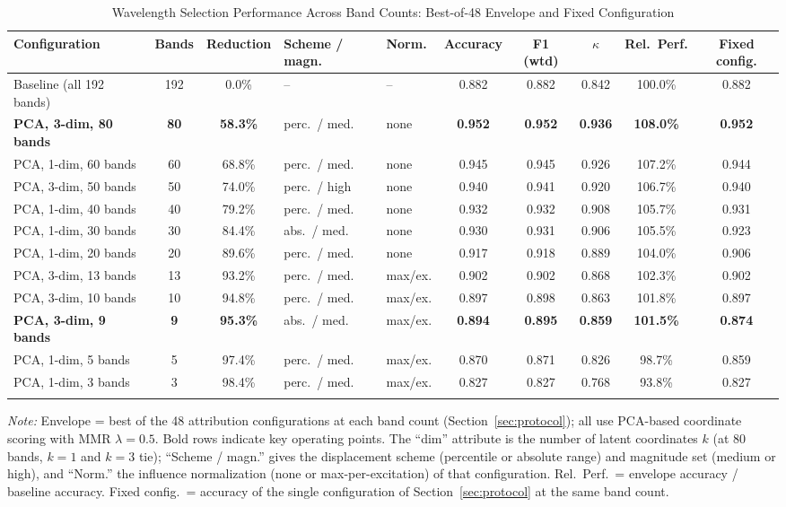 \begin{table}[!t]
\centering
\caption{Wavelength Selection Performance Across Band Counts: Best-of-48 Envelope and Fixed Configuration}
\label{tab:main_results}
\footnotesize
\begin{tabular}{@{}lccllccccc@{}}
\toprule
\textbf{Configuration} & \textbf{Bands} & \textbf{Reduction} & \textbf{Scheme / magn.} & \textbf{Norm.} & \textbf{Accuracy} & \textbf{F1 (wtd)} & \textbf{$\kappa$} & \textbf{Rel.\ Perf.} & \textbf{Fixed config.} \\
\midrule
Baseline (all 192 bands) & 192 & 0.0\% & -- & -- & 0.882 & 0.882 & 0.842 & 100.0\% & 0.882 \\
\midrule
\textbf{PCA, 3-dim, 80 bands} & \textbf{80} & \textbf{58.3\%} & perc.\ / med. & none & \textbf{0.952} & \textbf{0.952} & \textbf{0.936} & \textbf{108.0\%} & \textbf{0.952} \\
PCA, 1-dim, 60 bands & 60 & 68.8\% & perc.\ / med. & none & 0.945 & 0.945 & 0.926 & 107.2\% & 0.944 \\
PCA, 3-dim, 50 bands & 50 & 74.0\% & perc.\ / high & none & 0.940 & 0.941 & 0.920 & 106.7\% & 0.940 \\
PCA, 1-dim, 40 bands & 40 & 79.2\% & perc.\ / med. & none & 0.932 & 0.932 & 0.908 & 105.7\% & 0.931 \\
PCA, 1-dim, 30 bands & 30 & 84.4\% & abs.\ / med. & none & 0.930 & 0.931 & 0.906 & 105.5\% & 0.923 \\
PCA, 1-dim, 20 bands & 20 & 89.6\% & perc.\ / med. & none & 0.917 & 0.918 & 0.889 & 104.0\% & 0.906 \\
PCA, 3-dim, 13 bands & 13 & 93.2\% & perc.\ / med. & max/ex. & 0.902 & 0.902 & 0.868 & 102.3\% & 0.902 \\
PCA, 3-dim, 10 bands & 10 & 94.8\% & perc.\ / med. & max/ex. & 0.897 & 0.898 & 0.863 & 101.8\% & 0.897 \\
\textbf{PCA, 3-dim, 9 bands} & \textbf{9} & \textbf{95.3\%} & abs.\ / med. & max/ex. & \textbf{0.894} & \textbf{0.895} & \textbf{0.859} & \textbf{101.5\%} & \textbf{0.874} \\
PCA, 1-dim, 5 bands & 5 & 97.4\% & perc.\ / med. & max/ex. & 0.870 & 0.871 & 0.826 & 98.7\% & 0.859 \\
PCA, 1-dim, 3 bands & 3 & 98.4\% & perc.\ / med. & max/ex. & 0.827 & 0.827 & 0.768 & 93.8\% & 0.827 \\
\bottomrule
\vspace{0.2em}
\end{tabular}
\parbox{\textwidth}{\small\textit{Note:} Envelope = best of the 48 attribution configurations at each band count (Section~\ref{sec:protocol}); all use PCA-based coordinate scoring with MMR $\lambda = 0.5$. Bold rows indicate key operating points. The ``dim'' attribute is the number of latent coordinates $k$ (at 80 bands, $k = 1$ and $k = 3$ tie); ``Scheme / magn.'' gives the displacement scheme (percentile or absolute range) and magnitude set (medium or high), and ``Norm.'' the influence normalization (none or max-per-excitation) of that configuration. Rel.\ Perf.\ = envelope accuracy / baseline accuracy. Fixed config.\ = accuracy of the single configuration of Section~\ref{sec:protocol} at the same band count.}
\end{table}

